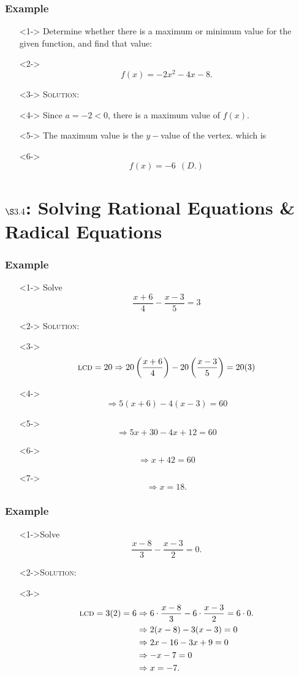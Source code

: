 \documentclass[handout]{beamer}
\begin{document}
\begin{frame}
	\frametitle{Example}
	\begin{enumerate}
		\item[]<1-> Determine whether there is a maximum or minimum value for the given function, and find that value:
		\item[]<2-> \[ f(x)=-2x^{2}-4x-8. \]
		\item[]<3-> \textsc{Solution:}
		\item[]<4-> Since $a=-2<0$, there is a maximum value of $f(x)$.
		\item[]<5-> The maximum value is the $y-$value of the vertex. which is
		\item[]<6-> \[ f(x)=-6~~(D.)\]
	\end{enumerate}
\end{frame}

\section{$\S 3.4$: Solving Rational Equations \& Radical Equations}

\begin{frame}
	\frametitle{Example}
	\begin{enumerate}
		\item[]<1-> Solve
		\[
			\frac{x+6}{4}-\frac{x-3}{5}=3
		\]
		\item[]<2-> \textsc{Solution:}
		\item[]<3-> \[ \text{\textsc{lcd}}=20 \Rightarrow 20 \left( \frac{x+6}{4}\right)-20\left(\frac{x-3}{5}\right)=20(3)\]
		\item[]<4-> \[ \Rightarrow 5(x+6)-4(x-3)=60 \]
		\item[]<5-> \[ \Rightarrow 5x+30-4x+12=60 \]
		\item[]<6-> \[ \Rightarrow x+42=60  \]
		\item[]<7-> \[ \Rightarrow x=18.  \]
	\end{enumerate}
\end{frame}

\begin{frame}
	\frametitle{Example}
	\begin{enumerate}
		\item[]<1->Solve
		\[
			\frac{x-8}{3}-\frac{x-3}{2}=0.
		\]
		\item[]<2->\textsc{Solution:}
		\item[]<3->
		\begin{align*}
			\text{\textsc{lcd}}=3(2)=6 & \Rightarrow 6 \cdot \frac{x-8}{3}- 6 \cdot \frac{x-3}{2}= 6 \cdot 0.  \\
			& \Rightarrow 2(x-8)-3(x-3)=0 \\
			& \Rightarrow 2x-16-3x+9=0 \\
			& \Rightarrow -x-7=0 \\
			& \Rightarrow x=-7.
		\end{align*}
	\end{enumerate}
\end{frame}
\end{document}
